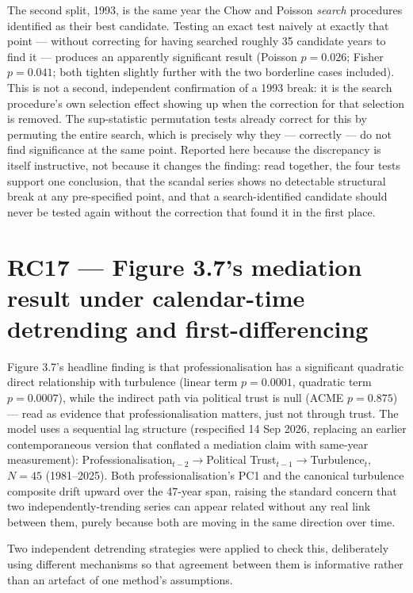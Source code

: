 The second split, 1993, is the same year the Chow and Poisson \emph{search} procedures identified as
their best candidate. Testing an exact test naively at exactly that point --- without correcting for
having searched roughly 35 candidate years to find it --- produces an apparently significant result
(Poisson $p=0.026$; Fisher $p=0.041$; both tighten slightly further with the two borderline cases
included). This is not a second, independent confirmation of a 1993 break: it is the search
procedure's own selection effect showing up when the correction for that selection is removed. The
sup-statistic permutation tests already correct for this by permuting the entire search, which is
precisely why they --- correctly --- do not find significance at the same point. Reported here
because the discrepancy is itself instructive, not because it changes the finding: read together,
the four tests support one conclusion, that the scandal series shows no detectable structural break
at any pre-specified point, and that a search-identified candidate should never be tested again
without the correction that found it in the first place.

\section{RC17 --- Figure 3.7's mediation result under calendar-time detrending and
first-differencing}

Figure 3.7's headline finding is that professionalisation has a significant quadratic direct
relationship with turbulence (linear term $p=0.0001$, quadratic term $p=0.0007$), while the
indirect path via political trust is null (ACME $p=0.875$) --- read as evidence that
professionalisation matters, just not through trust. The model uses a sequential lag structure
(respecified 14 Sep 2026, replacing an earlier contemporaneous version that conflated a
mediation claim with same-year measurement): Professionalisation$_{t-2}\to$Political
Trust$_{t-1}\to$Turbulence$_t$, $N=45$ (1981--2025). Both professionalisation's PC1 and the
canonical turbulence composite drift upward over the 47-year span, raising the standard concern
that two independently-trending series can appear related without any real link between them,
purely because both are moving in the same direction over time.

Two independent detrending strategies were applied to check this, deliberately using different
mechanisms so that agreement between them is informative rather than an artefact of one method's
assumptions.

